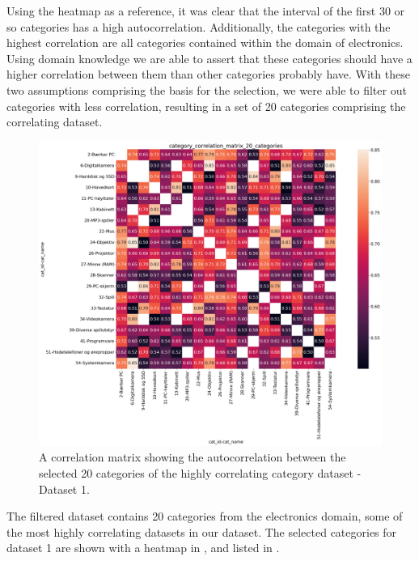 Using the heatmap as a reference, it was clear that the interval of the first 30 or so categories has a high autocorrelation.
Additionally, the categories with the highest correlation are all categories contained within the domain of electronics.
Using domain knowledge we are able to assert that these categories should have a higher correlation between them than other categories probably have.
With these two assumptions comprising the basis for the selection, we were able to filter out categories with less correlation, resulting in a set of 20 categories comprising the correlating dataset.
\begin{figure}[H]
  \centering
  \includegraphics[width=\textwidth]{./figs/dataset/category_correlation_matrix_20_categories.png}
  \hfill
  \caption{A correlation matrix showing the autocorrelation between the selected 20 categories of the highly correlating category dataset - Dataset 1.}
  \label{fig:dataset:heatmap_20_correlating}
\end{figure}


The filtered dataset contains 20 categories from the electronics domain, some of the most highly correlating datasets in our dataset.
The selected categories for dataset 1 are shown with a heatmap in ,
and listed in .

